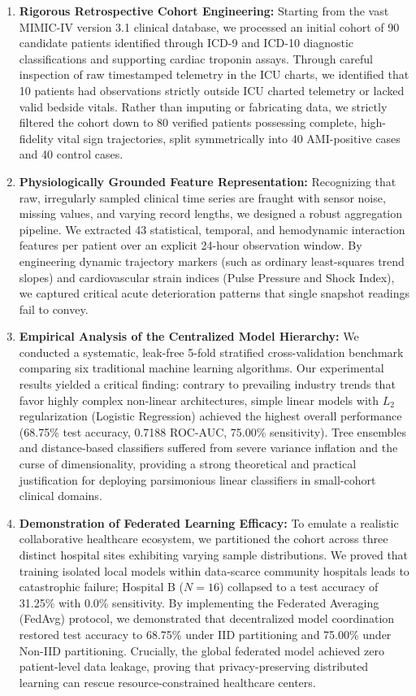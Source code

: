 \documentclass[12pt,a4paper,oneside]{report}
\begin{document}
\begin{enumerate}
    \item \textbf{Rigorous Retrospective Cohort Engineering:} Starting from the vast MIMIC-IV version 3.1 clinical database, we processed an initial cohort of 90 candidate patients identified through ICD-9 and ICD-10 diagnostic classifications and supporting cardiac troponin assays. Through careful inspection of raw timestamped telemetry in the ICU charts, we identified that 10 patients had observations strictly outside ICU charted telemetry or lacked valid bedside vitals. Rather than imputing or fabricating data, we strictly filtered the cohort down to 80 verified patients possessing complete, high-fidelity vital sign trajectories, split symmetrically into 40 AMI-positive cases and 40 control cases.
    
    \item \textbf{Physiologically Grounded Feature Representation:} Recognizing that raw, irregularly sampled clinical time series are fraught with sensor noise, missing values, and varying record lengths, we designed a robust aggregation pipeline. We extracted 43 statistical, temporal, and hemodynamic interaction features per patient over an explicit 24-hour observation window. By engineering dynamic trajectory markers (such as ordinary least-squares trend slopes) and cardiovascular strain indices (Pulse Pressure and Shock Index), we captured critical acute deterioration patterns that single snapshot readings fail to convey.
    
    \item \textbf{Empirical Analysis of the Centralized Model Hierarchy:} We conducted a systematic, leak-free 5-fold stratified cross-validation benchmark comparing six traditional machine learning algorithms. Our experimental results yielded a critical finding: contrary to prevailing industry trends that favor highly complex non-linear architectures, simple linear models with $L_2$ regularization (Logistic Regression) achieved the highest overall performance (68.75\% test accuracy, 0.7188 ROC-AUC, 75.00\% sensitivity). Tree ensembles and distance-based classifiers suffered from severe variance inflation and the curse of dimensionality, providing a strong theoretical and practical justification for deploying parsimonious linear classifiers in small-cohort clinical domains.
    
    \item \textbf{Demonstration of Federated Learning Efficacy:} To emulate a realistic collaborative healthcare ecosystem, we partitioned the cohort across three distinct hospital sites exhibiting varying sample distributions. We proved that training isolated local models within data-scarce community hospitals leads to catastrophic failure; Hospital B ($N=16$) collapsed to a test accuracy of 31.25\% with 0.0\% sensitivity. By implementing the Federated Averaging (FedAvg) protocol, we demonstrated that decentralized model coordination restored test accuracy to 68.75\% under IID partitioning and 75.00\% under Non-IID partitioning. Crucially, the global federated model achieved zero patient-level data leakage, proving that privacy-preserving distributed learning can rescue resource-constrained healthcare centers.
    

\end{enumerate}
\end{document}
